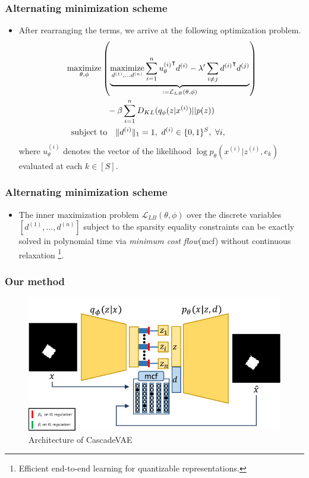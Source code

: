\documentclass[10pt,mathserif]{beamer}
\begin{document}
\begin{frame}
\frametitle{Alternating minimization scheme}
\begin{itemize}
\item
    After rearranging the terms, we arrive at the following optimization problem.
\begin{align}
&\operatorname*{maximize}_{\theta, \phi} \left(\underbrace{\operatorname*{maximize}_{d^{(1)},\ldots d^{(n)}} \sum_{i=1}^n {u_\theta^{(i)}}^\intercal d^{(i)} - \lambda' \sum_{i\neq j} {d^{(i)}}^\intercal d^{(j)}}_{:= \mathcal{L}_{LB}(\theta, \phi)} \right)\nonumber\\
&\qquad\qquad\quad - \beta \sum_{i=1}^n D_{KL}(q_\phi(z|x^{(i)})||p(z))\nonumber\\
&\text{\ \  subject to }~~ \| d^{(i)} \|_1 = 1,~ d^{(i)} \in \{0,1\}^S,~ \forall i, \nonumber
\end{align}
where $u_\theta^{(i)}$ denotes the vector of the  likelihood $\log p_\theta(x^{(i)}|z^{(i)}, e_k)$ evaluated at each $k \in [S]$.
        
\end{itemize}
\end{frame}

\begin{frame}
\frametitle{Alternating minimization scheme}
\begin{itemize}
    \item The inner maximization problem $\mathcal{L}_{LB}(\theta, \phi)$  over the discrete variables $[d^{(1)},\ldots,d^{(n)}]$ subject to the sparsity equality constraints can be exactly solved in polynomial time via \emph{minimum cost flow}(mcf) without  continuous relaxation \footnote{ {\color{blue}{Jeong, Y. and Song, H. O.}} Efficient end-to-end learning for quantizable representations. {\color{gray}{ICML2018}} }. 
\end{itemize}
\end{frame}

\begin{frame}
\frametitle{Our method}
\begin{figure}
\includegraphics[page=2, width=\linewidth]{dis_asset/arch}
\caption{Architecture of CascadeVAE}
\end{figure}
\end{frame} 
\end{document}
